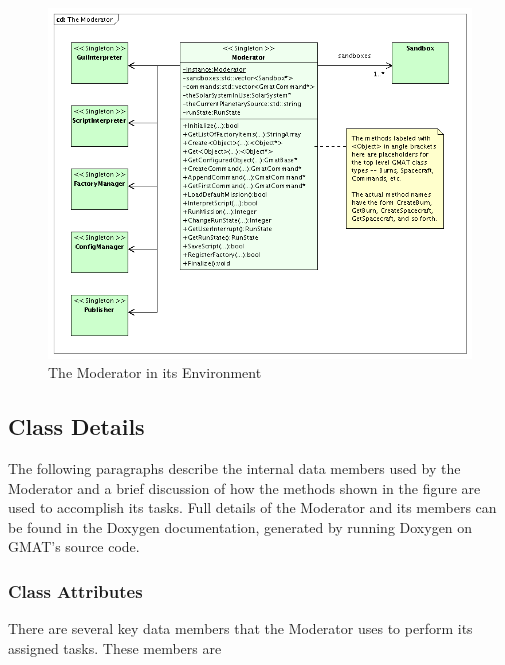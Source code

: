 \begin{figure}[htb]
\begin{center}
\includegraphics[370,306]{Images/TheModerator.png}
\caption{The Moderator in its Environment}
\label{figure:ModeratorClassDiagram}
\end{center}
\end{figure}

\subsection{Class Details}

The following paragraphs describe the internal data members used by
the Moderator and a brief discussion of how the methods shown in the figure are used to accomplish
its tasks.  Full details of the Moderator and its members can be found in the Doxygen
documentation, generated by running Doxygen\cite{doxygen} on GMAT's source code.

\subsubsection{Class Attributes}

There are several key data members that the Moderator uses to perform its assigned tasks.  These
members are

